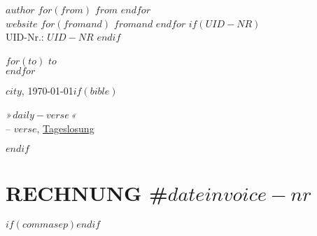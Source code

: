 \documentclass[$fontsize$, a4paper]{article}
\begin{document}
\small

\textsc{\textbf{\uppercase{$author$}}}
$for(from)$
\textbullet{} \textsc{$from$}
$endfor$ \\
$website$
$for(fromand)$
\textbullet{} {$fromand$}
$endfor$ $if(UID-NR)$ \\
  UID-Nr.: $UID-NR$ $endif$

\vspace{1em}

\normalsize \sffamily
$for(to)$
$to$\\
$endfor$

\vspace{2em}

\begin{flushright}
  \small
  $city$, \today $if(bible)$ \\[0.4em]
  \begin{minipage}{$versebreak$}
    \begin{flushright}
    \scriptsize \emph{»\,$daily-verse$\,«} \\[-0.5em]
    \tiny -- {$verse$}, \href{https://www.bible.com/de/verse-of-the-day}{Tageslosung} \small 
    \end{flushright}
  \end{minipage} $endif$
\end{flushright}

\vspace{1em}

\section*{\textsc{RECHNUNG} \textsc{\#$date$$invoice-nr$}}
\footnotesize
{}
\setcounter{pos}{0}
$if(commasep)$\STsetdecimalsep{,}$endif$ %
\end{document}
